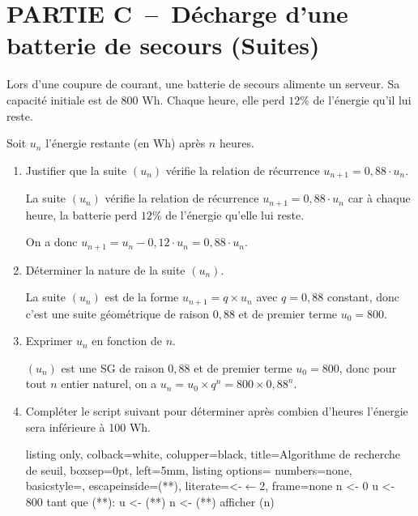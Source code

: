 \medskip

    \section*{PARTIE C~--~Décharge d'une batterie de secours (Suites)}

Lors d'une coupure de courant, une batterie de secours alimente un serveur. Sa capacité initiale est de 800 Wh. Chaque heure, elle perd $12\%$ de l'énergie qu'il lui reste.

Soit $u_n$ l'énergie restante (en Wh) après $n$ heures.

\begin{enumerate}[series=monDS, resume]
    \item Justifier que la suite $(u_n)$ vérifie la relation de récurrence $u_{n+1}=0,88\cdot u_n$.
    \begin{blocvisiblex}[height=3.5]
    {\quad}
    La suite $(u_n)$ vérifie la relation de récurrence $u_{n+1}=0,88\cdot u_n$ car à chaque heure, la batterie perd $12\%$ de l'énergie qu'elle lui reste.

    On a donc $u_{n+1}=u_n-0,12\cdot u_n=0,88\cdot u_n$.

    \end{blocvisiblex}
    \medskip
    \item Déterminer la nature de la suite $(u_n)$. 
    \begin{blocvisiblex}[height=2]
    {\quad}

    La suite $(u_n)$ est de la forme $u_{n+1}=q \times u_n$ avec $q=0,88$ constant, donc c'est une suite géométrique de raison $0,88$ et de premier terme $u_0=800$.
    \end{blocvisiblex}
    \medskip
    \item Exprimer $u_n$ en fonction de $n$. 
    \begin{blocvisiblex}[height=1.5]
    {\quad}
    $(u_n)$ est une SG de raison $0,88$ et de premier terme $u_0=800$, donc pour tout $n$ entier naturel, on a $u_n=u_0 \times q^n=800 \times 0,88^n$.
    \end{blocvisiblex}
    \medskip
    \item Compléter le script suivant pour déterminer après combien d'heures l'énergie sera inférieure à 100 Wh.
    

    \begin{tcblisting}{%
  listing only,
  colback=white, 
  colupper=black, 
  title=Algorithme de recherche de seuil,
  boxsep=0pt,
  left=5mm,
  listing options={
    numbers=none,
    basicstyle=\ttfamily,
    escapeinside={(*}{*)},
    literate={<-}{{$\bm{\leftarrow}$}}2, %
    frame=none %
    }
}
n <- 0
u <- 800
tant que (**):
        u <- (**)
        n <- (**)
afficher (n)
\end{tcblisting}


\end{enumerate}
